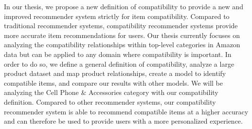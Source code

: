 \indent In our thesis, we propose a new definition of compatibility to provide a new and improved recommender system strictly for item compatibility. Compared to traditional recommender systems, compatibility recommender systems provide more accurate item recommendations for users. Our thesis currently focuses on analyzing the compatibility relationships within top-level categories in Amazon data but can be applied to any domain where compatibility is important. In order to do so, we define a general definition of compatibility, analyze a large product dataset and map product relationships, create a model to identify compatible items, and compare our results with other models. We will be analyzing the Cell Phone & Accessories category with our compatibility definition. Compared to other recommender systems, our compatibility recommender system is able to recommend compatible items at a higher accuracy and can therefore be used to provide users with a more personalized experience.

\pagebreak{}
